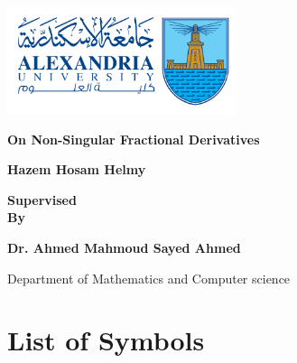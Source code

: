 \documentclass[twoside]{book}
\begin{document}
\Large{

\begin{titlepage}
    \centering
    \includegraphics[width=0.5\textwidth]{collagelogo.png}\par\vspace{1cm}

    {\huge\bfseries  On Non-Singular Fractional Derivatives \par}

    \vspace{2cm}
    {\huge\bfseries Hazem Hosam Helmy \par}
    \vspace{2.8cm}
    {\LARGE\bfseries Supervised \\ By\par}
    \vspace{0.5cm}
    {\LARGE\bfseries Dr. Ahmed Mahmoud Sayed Ahmed \par}
    \vspace{5.5cm}
    {\Large Department of Mathematics and Computer science \par}
    \vfill

\end{titlepage}
\tableofcontents
\chapter*{List of Symbols}

}
\end{document}
